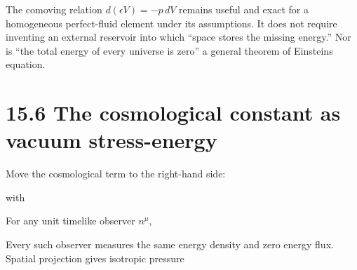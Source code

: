 \documentclass[
  11pt,
  letterpaper,
  oneside,
  openany]{scrbook}
\begin{document}
The comoving relation \(d(\epsilon V)=-p\,dV\) remains useful and exact
for a homogeneous perfect-fluid element under its assumptions. It does
not require inventing an external reservoir into which ``space stores
the missing energy.'' Nor is ``the total energy of every universe is
zero'' a general theorem of Einstein\textquotesingle s equation.

\hypertarget{the-cosmological-constant-as-vacuum-stress-energy}{%
\section{15.6 The cosmological constant as vacuum
stress-energy}\label{the-cosmological-constant-as-vacuum-stress-energy}}

Move the cosmological term to the right-hand side:

\begin{center}
\begingroup
{}
\ifdim\wd\grmathbox>\linewidth
\resizebox{\linewidth}{!}{\usebox{\grmathbox}}
\else\usebox{\grmathbox}\fi
\endgroup
\end{center}

with

\begin{center}
\begingroup
{}
\ifdim\wd\grmathbox>\linewidth
\resizebox{\linewidth}{!}{\usebox{\grmathbox}}
\else\usebox{\grmathbox}\fi
\endgroup
\end{center}

For any unit timelike observer \(n^\mu\),

\begin{center}
\begingroup
{}
\ifdim\wd\grmathbox>\linewidth
\resizebox{\linewidth}{!}{\usebox{\grmathbox}}
\else\usebox{\grmathbox}\fi
\endgroup
\end{center}

Every such observer measures the same energy density and zero energy
flux. Spatial projection gives isotropic pressure

\begin{center}
\begingroup
{}
\ifdim\wd\grmathbox>\linewidth
\resizebox{\linewidth}{!}{\usebox{\grmathbox}}
\else\usebox{\grmathbox}\fi
\endgroup
\end{center}
\end{document}
